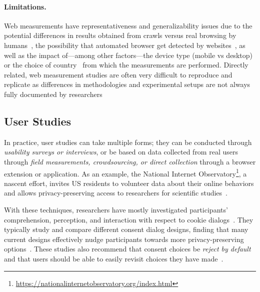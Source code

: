 \paragraph{Limitations.} Web measurements have representativeness and generalizability issues due to the potential differences in results obtained from crawls versus real browsing by humans~\cite{zeberRepresentativenessAutomatedWeb2020}, the possibility that automated browser get detected by websites~\cite{krumnowHowGullibleAre2022}, as well as the impact of---among other factors---the device type (mobile vs desktop)~\cite{yangComparativeMeasurementStudy2020,casselOmniCrawlComprehensiveMeasurement2022} or the choice of country~\cite{samarasingheGlobalPerspectiveWeb2019} from which the measurements are performed. Directly related, web measurement studies are often very difficult to reproduce and replicate as differences in methodologies and experimental setups are not always fully documented by researchers~\cite{demirReproducibilityReplicabilityWeb2022,hantkeWebExecutionBundles2025}


\subsection{User Studies}
\label{sec:user-studies}

In practice, user studies can take multiple forms; they can be conducted through \textit{usability surveys or interviews}, or be based on data collected from real users through \textit{field measurements, crowdsourcing, or direct collection} through a browser extension or application. As an example, the National Internet Observatory\footnote{\url{https://nationalinternetobservatory.org/index.html}}, a nascent effort, invites US residents to volunteer data about their online behaviors and allows privacy-preserving access to researchers for scientific studies~\cite{steningUnprecedentedDataCollection2022,callahanCanWeBetter2021,fealIntroductionNationalInternet2024}. 


With these techniques, researchers have mostly investigated participants’ comprehension, perception, and interaction with respect to cookie  dialogs~\cite{birrellSoKTechnicalImplementation2024,machuletzMultiplePurposesMultiple2020,bermejofernandezThisWebsiteUses2021,habibOkayWhateverEvaluation2022,singhWhatCookieConsent2022,bielovaSurveyAcademicStudies2022,Bielova2024-zr}. They typically study and compare different consent dialog designs, finding that many current designs effectively nudge participants towards more privacy-preserving options~\cite{machuletzMultiplePurposesMultiple2020,bermejofernandezThisWebsiteUses2021}. These studies also recommend that consent choices be \textit{reject by default} and that users should be able to easily revisit choices they have made~\cite{habibOkayWhateverEvaluation2022,Kanc-etal-25-PETs}.

